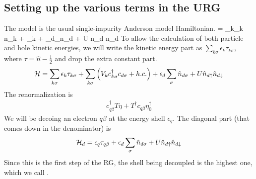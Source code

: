 \documentclass[12pt,twoside]{article}
\numberwithin{equation}{section}
\begin{document}
\subsection{Setting up the various terms in the URG}
The model is the usual single-impurity Anderson model Hamiltonian.
\beq
\ham = \sum_{k\sigma}\epsilon_k \hat n_{k\sigma} + \sum_{k\sigma}  + \epsilon_{d}\sum_\sigma  \hat n_{d\sigma} +  U \hat n_{d\ua} \hat n_{d\da}
\eeq
To allow the calculation of both particle and hole kinetic energies, we will write the kinetic energy part as \(\sum_{k\sigma}\epsilon_k \tau_{k\sigma}\), where \(\tau = \hat n - \frac{1}{2}\) and drop the extra constant part.
\begin{equation}
	\label{model:siam}
\mathcal{H} = \sum_{k\sigma}\epsilon_k \tau_{k\sigma} + \sum_{k\sigma} \left({V_{k} c^\dagger_{k\sigma} c_{d\sigma} + h.c.}\right) + \epsilon_{d}\sum_\sigma  \hat n_{d\sigma} +  U \hat n_{d\uparrow} \hat n_{d\downarrow}
\end{equation}
The renormalization is
\begin{equation}\begin{aligned}
\label{newh}
c^\dagger_{q\beta}T \eta + T^\dagger c_{q\beta}\eta_0^\dagger
\end{aligned}\end{equation}
We will be decoing an electron \(q\beta\) at the energy shell \(\epsilon_q\). The diagonal part (that comes down in the denominator) is
\begin{equation}\begin{aligned}
	\label{term1}
\mathcal{H}_d = \epsilon_q \tau_{q\beta} + \epsilon_{d}\sum_\sigma  \hat n_{d\sigma} +  U \hat n_{d\uparrow} \hat n_{d\downarrow}
\end{aligned}\end{equation}
Since this is the first step of the RG, the shell being decoupled is the highest one, which we call .
\end{document}
